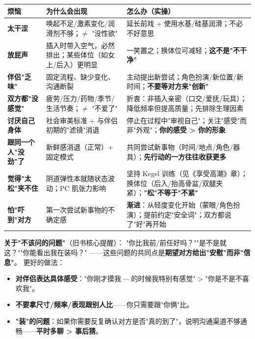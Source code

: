 \documentclass[12pt,UTF8,openany]{ctexbook}
\begin{document}
\begin{tabularx}{\textwidth}{@{}X X X@{}}
\toprule
\textbf{烦恼} & \textbf{为什么会出现} & \textbf{怎么办（实操）} \\
\midrule
\textbf{太干涩} & 唤起不足/激素变化/润滑剂不够；$\ne$ "没性欲" & 延长前戏 + 使用水基/硅基润滑；不必不好意思 \\
\midrule
\textbf{放屁声} & 插入时带入空气，必然排出；某些体位（如女上/后入）更明显 & 一笑置之；换体位可减轻；\textbf{这不是"不干净"} \\
\midrule
\textbf{伴侣"乏味"} & 固定流程、缺少变化、沟通断裂 & 主动提出新尝试；角色扮演/新位置/新时间；\textbf{不要等对方来"创新"} \\
\midrule
\textbf{双方都"没感觉"} & 疲劳/压力/药物/季节/生活节奏；$\ne$ "不爱了" & 折衷：非插入亲密（口交/爱抚/玩具）；降低频率但提高质量；先排除生理因素 \\
\midrule
\textbf{讨厌自己身体} & 社会审美标准 + 与伴侣初期的"滤镜"消退 & 停止在过程中"审视自己"；关注"感受"而非"外观"；\textbf{你的感受 > 你的形象} \\
\midrule
\textbf{跟同一个人"没劲"了} & 新鲜感消退（正常）+ 固定模式 & 共同尝试新事物（时间/地点/角色/器具）；\textbf{先行动的一方往往收获更多} \\
\midrule
\textbf{觉得"太松"夹不住} & 阴道弹性本就随状态波动；PC 肌张力影响 & 坚持 Kegel 训练（见《享受高潮》章）；换体位（后入/抬高骨盆/双腿夹紧）；\textbf{"松"不等于"不紧"} \\
\midrule
\textbf{怕"吓到"对方} & 第一次尝试新事物的不确定感 & \textbf{渐进}：从轻度变化开始（蒙眼/角色扮演）；提前约定"安全词"；双方都说了"好"再开始 \\
\bottomrule
\end{tabularx}

\vspace{1em}
\noindent\textbf{关于"不该问的问题"}（旧书核心提醒）：
"你比我前/前任好吗？""是不是就这？""你能看出我在装吗？"
——这些问题的共同点是\textbf{期望对方给出"安慰"而非"信息"}。
更好的做法：
\begin{itemize}[leftmargin=2em,itemsep=0.3em]
  \item \textbf{对伴侣表达具体感受}："你刚才摸我 $\cdots$ 的时候我特别有感觉" > "你是不是不喜欢我"。
  \item \textbf{不要拿尺寸/频率/表现跟别人比}——你只需要跟"你俩"比。
  \item \textbf{"装"的问题}：如果你需要反复确认对方是否"真的到了"，说明沟通渠道不够通畅——\textbf{平时多聊 > 事后猜}。
\end{itemize}
\end{document}
